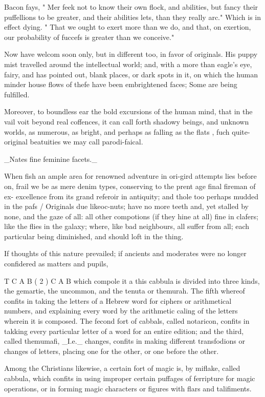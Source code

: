 \documentclass{article}
\begin{document}
Bacon fays, " Mer feek not to know their own flock, and abilities, but fancy their puffellions to be greater, and their abilities lets, than they really arc." Which is in effect dying. " That we ought to exert more than we do, and that, on exertion, our probability of fuccefs is greater than we conceive."

Now have welcom soon only, but in different too, in favor of originals. His puppy mist travelled around the intellectual world; and, with a more than eagle’s eye, fairy, and has pointed out, blank places, or dark spots in it, on which the human minder house flows of thefe have been embrightened faces; Some are being fulfilled.

Moreover, to boundless ear the bold excursions of the human mind, that in the vail voit beyond real coffences, it can call forth shadowy beings, and unknown worlds, as numerous, as bright, and perhaps as falling as the flats , fuch quite-original beatuities we may call parodi-faical.

\_Nates fine feminine facets.\_

When fish an ample area for renowned adventure in ori-gird attempts lies before on, frail we be as mere denim types, conserving to the prent age final fireman of ex- excellence from its grand referoir in antiquity; and thole too perhaps mudded in the pafs / Originals due likeoc-nuts; have no more teeth and, yet stalled by none, and the gaze of all: all other compotions (if they hine at all) fine in clafers; like the flies in the galaxy; where, like bad neighbours, all suffer from all; each particular being diminished, and should loft in the thing.

If thoughts of this nature prevailed; if ancients and moderates were no longer confidered as matters and pupils,

T C A B ( 2 ) C A B which compole it a this cabbula is divided into three kinds, the gemartie, the uncommon, and the tenuta or themurah. The fifth whereof confits in taking the letters of a Hebrew word for ciphers or arithmetical numbers, and explaining every word by the arithmetic caling of the letters wherein it is composed. The fecond fort of cabbals, called notaricon, confits in takking every particular letter of a word for an entire edition; and the third, called themumafi, \_I.e.\_ changes, confits in making different transfodions or changes of letters, placing one for the other, or one before the other.

Among the Christians likewise, a certain fort of magic is, by miflake, called cabbula, which confits in using improper certain puffages of ferripture for magic operations, or in forming magic characters or figures with flars and talifiments.
\end{document}
